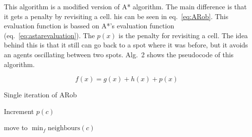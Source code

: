 This algorithm is a modified version of A* algorithm. The main difference is that it gets a penalty by revisiting a cell.  his can be seen in eq.~\ref{eq:ARob}. This evaluation function is bassed on A*'s evaluation function (eq.~\ref{eq:astarevaluation}). The $p(x)$ is the penalty for revisiting a cell. The idea behind this is that it still can go back to a spot where it was before, but it avoids an agents oscillating between two spots. Alg.~2 shows the pseudocode of this algorithm.

\begin{equation}
	\label{eq:ARob}
 	f(x) = g(x) + h(x) + p(x)
\end{equation}


\begin{algorithm}[h!]
    \label{al:ARob}
    \caption{Single iteration of ARob}
    Increment $p(c)$\;
    
    move to $\min_f \mathrm{neighbours}(c)$
\end{algorithm}

        
        
        
        
        
    
